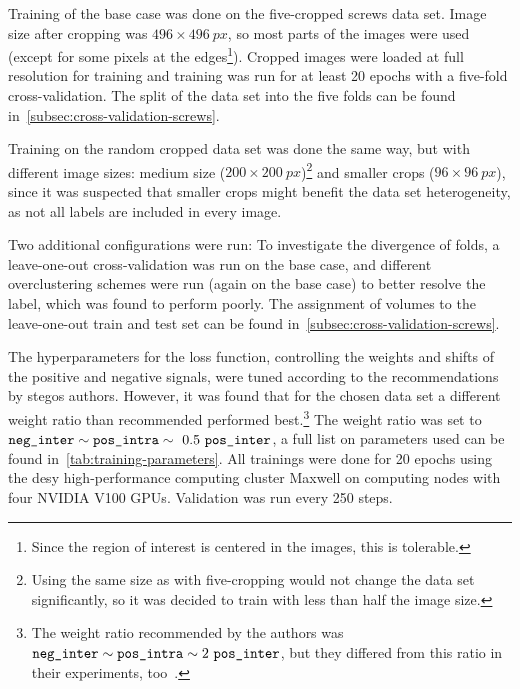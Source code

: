 Training of the base case was done on the five-cropped screws data set.
Image size after cropping was $496 \times 496~px$, so most parts of the images were used (except for some pixels at the edges\footnote{Since the region of interest is centered in the images, this is tolerable.}).
Cropped images were loaded at full resolution for training and training was run for at least 20 epochs with a five-fold cross-validation.
The split of the data set into the five folds can be found in~\autoref{subsec:cross-validation-screws}.

Training on the random cropped data set was done the same way, but with different image sizes: medium size ($200 \times 200~px$)\footnote{Using the same size as with five-cropping would not change the data set significantly, so it was decided to train with less than half the image size.} and smaller crops ($96 \times 96~px$), since it was suspected that smaller crops might benefit the data set heterogeneity, as not all labels are included in every image.

Two additional configurations were run:
To investigate the divergence of folds, a leave-one-out cross-validation was run on the base case, and different overclustering schemes were run (again on the base case) to better resolve the  label, which was found to perform poorly.
The assignment of volumes to the leave-one-out train and test set can be found in~\autoref{subsec:cross-validation-screws}.


The hyperparameters for the loss function, controlling the weights and shifts of the positive and negative signals, were tuned according to the recommendations by \gls{stego}s authors.
However, it was found that for the chosen data set a different weight ratio than recommended performed best.\footnote{The weight ratio recommended by the authors was $\texttt{neg\_inter} \sim \texttt{pos\_intra} \sim 2~\texttt{pos\_inter}$, but they differed from this ratio in their experiments, too~\autocite{Hamilton2022}.}
The weight ratio was set to $\texttt{neg\_inter} \sim \texttt{pos\_intra} \sim~0.5~\texttt{pos\_inter}$, a full list on parameters used can be found in~\autoref{tab:training-parameters}.
All trainings were done for 20 epochs using the \gls{desy} high-performance computing cluster Maxwell on computing nodes with four NVIDIA V100 GPUs.
Validation was run every 250 steps.

